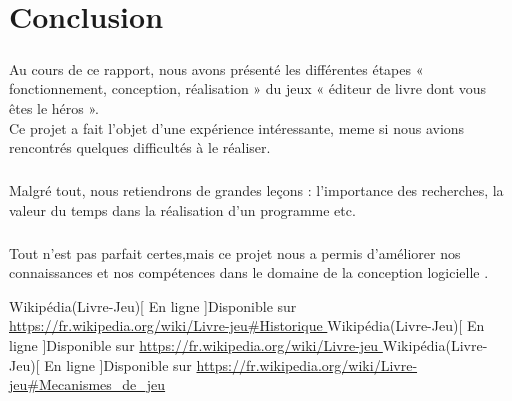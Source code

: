 \documentclass[12pt,a4paper]{article}
\begin{document}
\newpage
\chapter{Conclusion }
    \paragraph{}Au cours de ce rapport, nous avons présenté les différentes étapes « fonctionnement, conception, réalisation » du jeux «  éditeur de livre dont vous êtes le héros ». 
    \\Ce projet a fait l’objet d’une expérience intéressante, meme si nous avions rencontrés quelques difficultés à le réaliser.
    \paragraph{}Malgré tout, nous retiendrons de grandes leçons : l’importance des recherches, la valeur du temps dans la réalisation d’un programme etc.
    \paragraph{}Tout n’est pas parfait certes,mais ce projet nous a permis d’améliorer nos connaissances et nos compétences dans le domaine de la conception logicielle .
\newpage

\newpage
\begin{thebibliography}{9}
 Wikipédia(Livre-Jeu)[ En ligne ]Disponible sur
\href{ https://fr.wikipedia.org/wiki/Livre-jeu#Historique}{https://fr.wikipedia.org/wiki/Livre-jeu#Historique  }
 Wikipédia(Livre-Jeu)[ En ligne ]Disponible sur
\href{ https://fr.wikipedia.org/wiki/Livre-jeu}{https://fr.wikipedia.org/wiki/Livre-jeu  }
 Wikipédia(Livre-Jeu)[ En ligne ]Disponible sur
\href{ https://fr.wikipedia.org/wiki/Livre-jeu#Mecanismes_de_jeu}{https://fr.wikipedia.org/wiki/Livre-jeu#Mecanismes_de_jeu}

\end{thebibliography}

\end{document}
